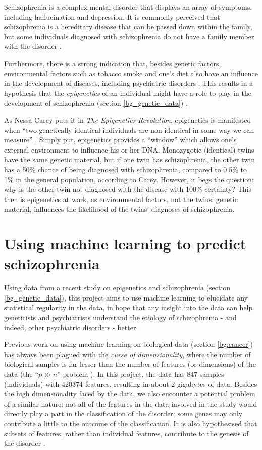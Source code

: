 \documentclass[12pt, twoside, a4paper]{report}
\begin{document}
Schizophrenia is a complex mental disorder that displays an array of symptoms, including hallucination and depression. It is commonly perceived that schizophrenia is a hereditary disease that can be passed down within the family, but some individuals diagnosed with schizophrenia do not have a family member with the disorder \cite{RefWorks:8}. 

Furthermore, there is a strong indication that, besides genetic factors, environmental factors such as tobacco smoke and one's diet also have an influence in the development of diseases, including psychiatric disorders \cite{RefWorks:8, RefWorks:10, RefWorks:247}. This results in a hypothesis that the \textit{epigenetics} of an individual might have a role to play in the development of schizophrenia (section \ref{bg_genetic_data}) \cite{RefWorks:12}.

As Nessa Carey puts it in \textit{The Epigenetics Revolution}, epigenetics is manifested when ``two genetically identical individuals are non-identical in some way we can measure'' \cite{RefWorks:248}. Simply put, epigenetics provides a ``window'' which allows one's external environment to influence his or her DNA. Monozygotic (identical) twins have the same genetic material, but if one twin has schizophrenia, the other twin has a 50\% chance of being diagnosed with schizophrenia, compared to 0.5\% to 1\% in the general population, according to Carey. However, it begs the question: why is the other twin not diagnosed with the disease with 100\% certainty? This then is epigenetics at work, as environmental factors, not the twins' genetic material, influences the likelihood of the twins' diagnoses of schizophrenia.


\section{Using machine learning to predict schizophrenia} \label{intro_ML}

Using data from a recent study on epigenetics and schizophrenia (section \ref{bg_genetic_data}), this project aims to use machine learning to elucidate any statistical regularity in the data, in hope that any insight into the data can help geneticists and psychiatrists understand the etiology of schizophrenia - and indeed, other psychiatric disorders - better.

Previous work on using machine learning on biological data (section \ref{bg:cancer}) has always been plagued with the \textit{curse of dimensionality}, where the number of biological samples is far lesser than the number of features (or dimensions) of the data (the ``$p \gg n$'' problem \cite{RefWorks:96}). In this project, the data has 847 samples (individuals) with 420374 features, resulting in about 2 gigabytes of data. Besides the high dimensionality faced by the data, we also encounter a  potential problem of a similar nature: not all of the features in the data involved in the study would directly play a part in the classification of the disorder; some genes may only contribute a little to the outcome of the classification. It is also hypothesised that subsets of features, rather than individual features, contribute to the genesis of the disorder \cite{RefWorks:10}. 
\end{document}
